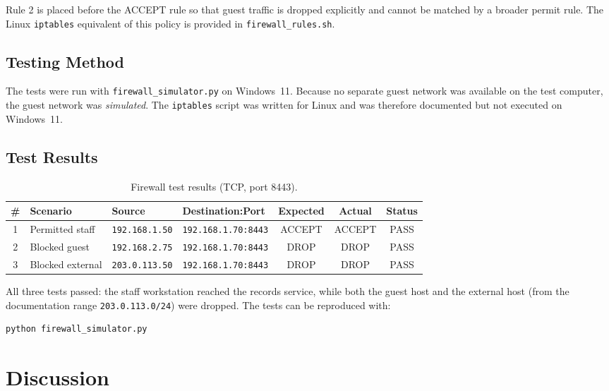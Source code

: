 \documentclass[11pt,a4paper]{article}
\begin{document}
Rule 2 is placed before the ACCEPT rule so that guest traffic is dropped explicitly
and cannot be matched by a broader permit rule. The Linux \texttt{iptables}
equivalent of this policy is provided in \texttt{firewall\_rules.sh}.

\subsection{Testing Method}
The tests were run with \texttt{firewall\_simulator.py} on Windows~11. Because no
separate guest network was available on the test computer, the guest network was
\emph{simulated}. The \texttt{iptables} script was written for Linux and was
therefore documented but not executed on Windows~11.

\subsection{Test Results}
\begin{table}[h!]
\centering
\renewcommand{\arraystretch}{1.3}
\begin{tabular}{@{}c l l l c c c@{}}
\toprule
\textbf{\#} & \textbf{Scenario} & \textbf{Source} & \textbf{Destination:Port} &
\textbf{Expected} & \textbf{Actual} & \textbf{Status} \\
\midrule
1 & Permitted staff   & \texttt{192.168.1.50}  & \texttt{192.168.1.70:8443} & ACCEPT & ACCEPT & PASS \\
2 & Blocked guest     & \texttt{192.168.2.75}  & \texttt{192.168.1.70:8443} & DROP   & DROP   & PASS \\
3 & Blocked external  & \texttt{203.0.113.50}  & \texttt{192.168.1.70:8443} & DROP   & DROP   & PASS \\
\bottomrule
\end{tabular}
\caption{Firewall test results (TCP, port 8443).}
\end{table}

All three tests passed: the staff workstation reached the records service, while
both the guest host and the external host (from the documentation range
\texttt{203.0.113.0/24}) were dropped. The tests can be reproduced with:

\begin{lstlisting}[language=bash,numbers=none]
python firewall_simulator.py
\end{lstlisting}

\section{Discussion}
\end{document}
